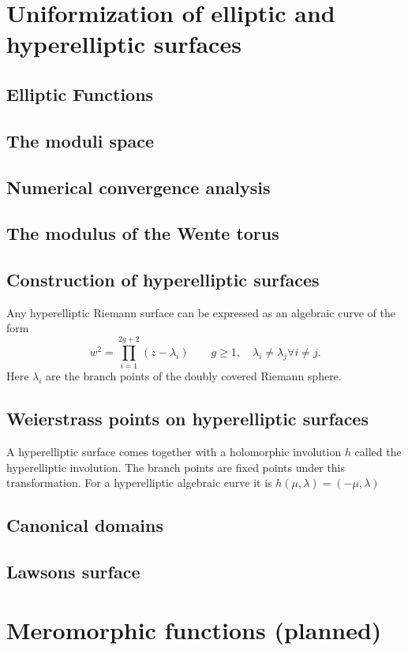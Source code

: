 \documentclass{book}
\begin{document}
\section{Uniformization of elliptic and hyperelliptic surfaces}
\subsection{Elliptic Functions}
\subsection{The moduli space}
\subsection{Numerical convergence analysis}
\subsection{The modulus of the Wente torus}

\subsection{Construction of hyperelliptic surfaces}
Any hyperelliptic Riemann surface can be expressed as an algebraic curve of the form
\[ w^2 = \prod_{i=1}^{2g+2}(z-\lambda_i) \quad\quad g\geq1,\quad \lambda_i\neq \lambda_j \forall i\neq j.\]
Here $\lambda_i$ are the branch points of the doubly covered Riemann sphere.

\subsection{Weierstrass points on hyperelliptic surfaces}
A hyperelliptic surface comes together with a holomorphic involution $h$ called the hyperelliptic involution. The branch points are fixed points under this transformation. For a hyperelliptic algebraic curve it is $h(\mu, \lambda)=(-\mu, \lambda)$

\subsection{Canonical domains}
\subsection{Lawsons surface}


\section{Meromorphic functions (planned)}
\end{document}
